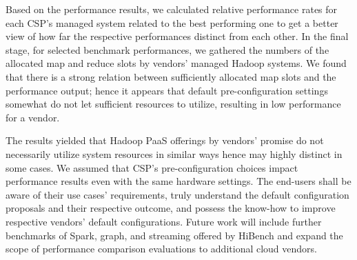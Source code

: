 \documentclass[review]{elsarticle}
\begin{document}
Based on the performance results, we calculated relative performance rates for each CSP's managed system related to the best performing one to get a better view of how far the respective performances distinct from each other. In the final stage, for selected benchmark performances, we gathered the numbers of the allocated map and reduce slots by vendors' managed Hadoop systems. We found that there is a strong relation between sufficiently allocated map slots and the performance output; hence it appears that default pre-configuration settings somewhat do not let sufficient resources to utilize, resulting in low performance for a vendor.

The results yielded that Hadoop PaaS offerings by vendors' promise do not necessarily utilize system resources in similar ways hence may highly distinct in some cases. We assumed that CSP's pre-configuration choices impact performance results even with the same hardware settings. The end-users shall be aware of their use cases' requirements, truly understand the default configuration proposals and their respective outcome, and possess the know-how to improve respective vendors' default configurations. %
Future work will include further benchmarks of Spark, graph, and streaming offered by HiBench and expand the scope of performance comparison evaluations to additional cloud vendors. %


	
\end{document}
